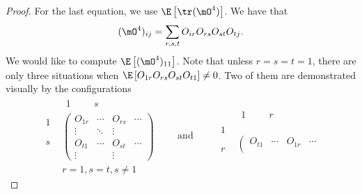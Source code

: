 \begin{proof}
    For the last equation, we use $\E\left[ \tr(\mO^4) \right]$.  We have that 
    \[
        (\mO^4)_{ij} = \sum_{r,s,t} O_{ir} O_{rs} O_{st} O_{tj}.
    \]
    We would like to compute $\E\left[ (\mO^4)_{11} \right]$.  Note that
    unless $r=s=t=1$, there are only three situations when
    $\E \left[ O_{1r} O_{rs} O_{st} O_{t1} \right] \neq 0$.   Two of them are 
    demonstrated visually by the configurations
    \[
        \begin{matrix}
            \phantom{0} &
            \begin{matrix} 
                1 & \phantom{\cdots} & s \phantom{\cdots}
            \end{matrix} \\
            \begin{matrix}
                1 \\
                \phantom{\vdots}  \\
                s \\
                \phantom{\vdots}
            \end{matrix}&
            \left(
            \begin{matrix}
                O_{1r} & \cdots & O_{rs} & \cdots \\
                \vdots  & \ddots & \vdots  & \\
                O_{t1} & \cdots & O_{st} & \cdots \\
                \vdots  &        & \vdots  &
            \end{matrix}
            \right) \\
            \phantom{0} &
            r=1, s=t, s \neq 1
        \end{matrix}
        \quad\quad\text{and}\quad\quad
        \begin{matrix}
            \phantom{0} &
            \begin{matrix} 
                1 & \phantom{\cdots} & r \phantom{\cdots}
            \end{matrix} \\
            \begin{matrix}
                1 \\
                \phantom{\vdots}  \\
                r \\
                \phantom{\vdots}
            \end{matrix}&
            \left(
            \begin{matrix}
                O_{t1} & \cdots & O_{1r} & \cdots \\

\end{matrix}
\end{matrix}\]
\end{proof}
